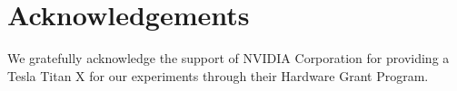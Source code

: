 \documentclass[runningheads]{llncs}
\begin{document}
\section*{Acknowledgements}

We gratefully acknowledge the support of NVIDIA Corporation for providing a Tesla Titan X for our experiments through their Hardware Grant Program.



\end{document}
